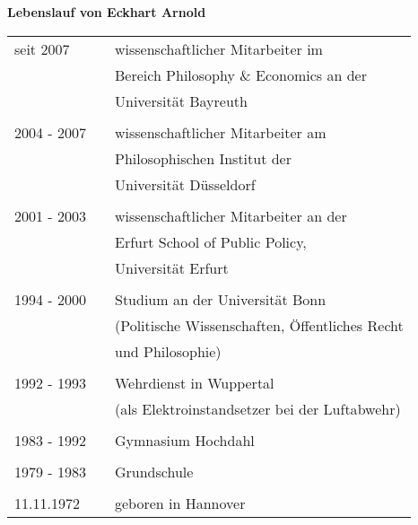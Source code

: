 \newpage
\thispagestyle{empty}
{\bf Lebenslauf von Eckhart Arnold}
\setlength{\parskip}{1.5cm}
\setlength{\parindent}{0cm}

\begin{tabular}{lcl}

seit 2007 & & wissenschaftlicher Mitarbeiter im \\
          & & Bereich Philosophy \& Economics an der \\
          & & Universität Bayreuth \\

& & \\

2004 - 2007 & & wissenschaftlicher Mitarbeiter am \\
            & & Philosophischen Institut der \\
            & & Universität Düsseldorf\\
& & \\

2001 - 2003 & & wissenschaftlicher Mitarbeiter an der \\
            & & Erfurt School of Public Policy, \\
            & & Universität Erfurt \\

& & \\

1994 - 2000 & & Studium an der Universität Bonn \\
            & & (Politische Wissenschaften, Öffentliches Recht \\
            & &  und Philosophie)\\

& & \\

1992 - 1993 & & Wehrdienst in Wuppertal \\
            & & (als Elektroinstandsetzer bei der Luftabwehr)\\

& & \\

1983 - 1992 & & Gymnasium Hochdahl\\

& & \\

1979 - 1983 & & Grundschule\\

& & \\

11.11.1972  & & geboren in Hannover\\

\end{tabular}
